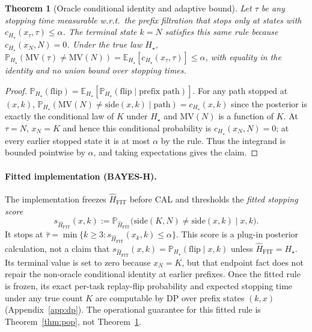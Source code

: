 \documentclass{article}
\newtheorem{theorem}{Theorem}
\theoremstyle{definition}
\theoremstyle{remark}
\newcommand{\flip}{\mathrm{flip}}
\newcommand{\trueH}{H_\star}
\newcommand{\oraclecert}{c_{\trueH}}
\newcommand{\fitscore}{s_{\widehat H_{\mathrm{FIT}}}}
\newcommand{\MV}{\mathrm{MV}}
\newcommand{\E}{\mathbb{E}}
\renewcommand{\P}{\mathbb{P}}
\begin{document}
\begin{theorem}[Oracle conditional identity and adaptive bound]
\label{thm:tower}
Let $\tau$ be any stopping time measurable w.r.t.\ the prefix filtration that
stops only at states with $\oraclecert(x_\tau,\tau)\le\alpha$. The terminal
state $k=N$ satisfies this same rule because $\oraclecert(x_N,N)=0$. Under
the true law $\trueH$,
$\P_{\trueH}(\MV(\tau)\neq\MV(N)) = \E_{\trueH}[\oraclecert(x_\tau,\tau)]\le\alpha$,
with equality in the identity and no union bound over stopping times.
\end{theorem}
\begin{proof}
$\P_{\trueH}(\flip)=\E_{\trueH}[\P_{\trueH}(\flip\mid\text{prefix path})]$.
For any path stopped at $(x,k)$,
$\P_{\trueH}(\MV(N)\neq\mathrm{side}(x,k)\mid\text{path})=\oraclecert(x,k)$
since the posterior is exactly the conditional law of $K$ under $\trueH$ and $\MV(N)$ is a
function of $K$. At $\tau=N$, $x_N=K$ and hence this conditional probability
is $\oraclecert(x_N,N)=0$; at every earlier stopped state it is at most $\alpha$ by
the rule. Thus the integrand is bounded pointwise by $\alpha$, and taking
expectations gives the claim.
\end{proof}

\paragraph{Fitted implementation (BAYES-H).}
The implementation freezes $\widehat H_{\mathrm{FIT}}$ before CAL and thresholds
the \emph{fitted stopping score}
\[
\fitscore(x,k):=\P_{\widehat H_{\mathrm{FIT}}}
\big(\mathrm{side}(K,N)\neq\mathrm{side}(x,k)\mid x,k\big).
\]
It stops at $\widehat\tau=\min\{k\ge3:\fitscore(x_k,k)\le\alpha\}$.
This score is a plug-in posterior calculation, not a claim that
$\fitscore(x,k)=\P_{\trueH}(\flip\mid x,k)$ unless
$\widehat H_{\mathrm{FIT}}=\trueH$. Its terminal value is set to zero because
$x_N=K$, but that endpoint fact does not repair the non-oracle conditional
identity at earlier prefixes. Once the fitted rule is frozen, its exact
per-task replay-flip probability and expected stopping time under any true
count $K$ are computable by DP over prefix states $(k,x)$
(Appendix~\ref{app:dp}). The operational guarantee for this fitted rule is
Theorem~\ref{thm:pop}, not Theorem~\ref{thm:tower}.
\end{document}
